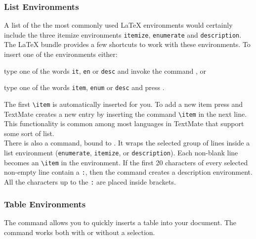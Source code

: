 \documentclass[11pt, x11names]{article}
\begin{document}
\subsubsection{List Environments}

A list of the the most commonly used LaTeX environments would certainly include the three itemize environments \texttt{itemize}, \texttt{enumerate} and \texttt{description}. The LaTeX bundle provides a few shortcuts to work with these environments. To insert one of the environments either:

\begin{enumerate}

    \begin{sloppypar}
    \item type one of the words \texttt{it}, \texttt{en} or \texttt{desc} and invoke the command , or
    \end{sloppypar}

    \item type one of the words \texttt{item}, \texttt{enum} or \texttt{desc} and press \keys{\tab}.

\end{enumerate}

The first \texttt{\textbackslash{}item} is automatically inserted for you. To add a new item press \keys{\enter} and TextMate creates a new entry by inserting the command \texttt{\textbackslash{}item} in the next line. This functionality is common among most languages in TextMate that support some sort of list.\\

There is also a  command, bound to . It wraps the selected group of lines inside a list environment (\texttt{enumerate}, \texttt{itemize}, or \texttt{description}). Each non-blank line becomes an \texttt{\textbackslash{}item} in the environment. If the first 20 characters of every selected non-empty line contain a \texttt{:}, then the command creates a description environment. All the characters up to the \texttt{:} are placed inside brackets.

\subsubsection{Table Environments}

The command  allows you to quickly inserts a table into your document. The command works both with or without a selection.\\
\end{document}
